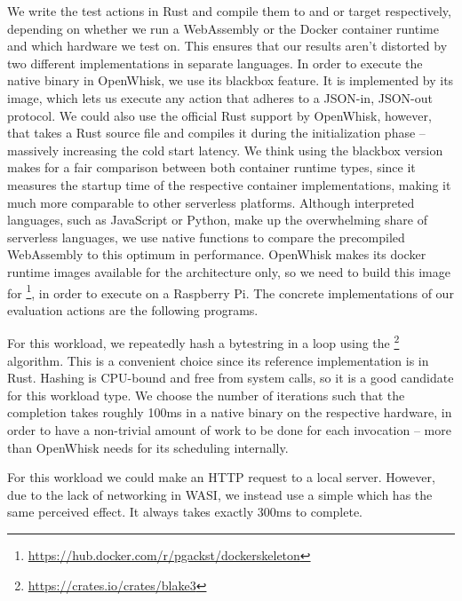 We write the test actions in Rust and compile them to  and  or  target respectively, depending on whether we run a WebAssembly or the Docker container runtime and which hardware we test on. This ensures that our results aren't distorted by two different implementations in separate languages. In order to execute the native binary in OpenWhisk, we use its blackbox feature. It is implemented by its  image, which lets us execute any action that adheres to a JSON-in, JSON-out protocol. We could also use the official Rust support by OpenWhisk, however, that takes a Rust source file and compiles it during the initialization phase -- massively increasing the cold start latency. We think using the blackbox version makes for a fair comparison between both container runtime types, since it measures the startup time of the respective container implementations, making it much more comparable to other serverless platforms. Although interpreted languages, such as JavaScript or Python, make up the overwhelming share of serverless languages, we use native functions to compare the precompiled WebAssembly to this optimum in performance.
OpenWhisk makes its docker runtime images available for the  architecture only, so we need to build this image for \footnote{\url{https://hub.docker.com/r/pgackst/dockerskeleton}}, in order to execute on a Raspberry Pi. The concrete implementations of our evaluation actions are the following programs.

\begin{description}[style=multiline, leftmargin=2.5cm, font=\bfseries]
    \item[CPU-bound] For this workload, we repeatedly hash a bytestring in a loop using the \footnote{\url{https://crates.io/crates/blake3}} algorithm. This is a convenient choice since its reference implementation is in Rust. Hashing is CPU-bound and free from system calls, so it is a good candidate for this workload type. We choose the number of iterations such that the completion takes roughly 100ms in a native binary on the respective hardware, in order to have a non-trivial amount of work to be done for each invocation -- more than OpenWhisk needs for its scheduling internally.
    \item[Network I/O-bound] For this workload we could make an HTTP request to a local server. However, due to the lack of networking in WASI, we instead use a simple  which has the same perceived effect. It always takes exactly 300ms to complete.
\end{description}


